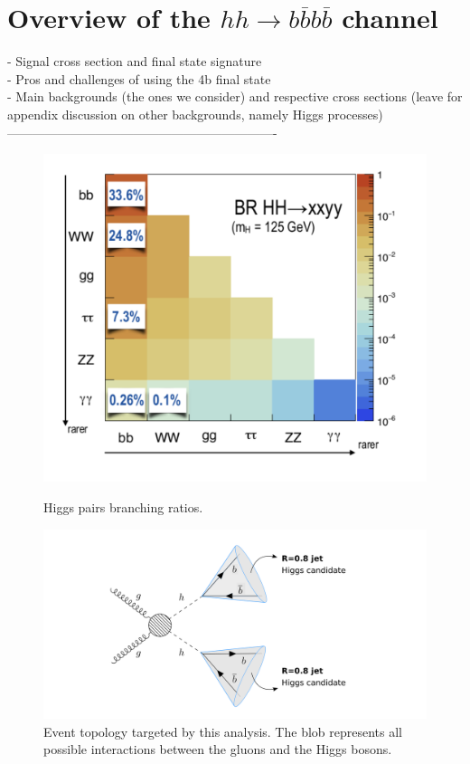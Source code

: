 \section{Overview of the $hh\rightarrow b\overline{b}b\overline{b}$ channel}
- Signal cross section and final state signature \\
- Pros and challenges of using the 4b final state \\
- Main backgrounds (the ones we consider) and respective cross sections (leave for appendix discussion on other backgrounds, namely Higgs processes)\\
----------------------------------------------------------------\\
\begin{figure}
	\centering
	\begin{minipage}{.45\textwidth}
		\centering
		\includegraphics[width=\linewidth]{./Figures/hhBR.png}
		\caption{Higgs pairs branching ratios.}
		\label{fig_hhBR}
	\end{minipage}%
	\begin{minipage}{.55\textwidth}
		\centering
		\includegraphics[trim={4cm 0 5cm 0},clip,width=\linewidth]{./Figures/boosted1.png}
		\caption{Event topology targeted by this analysis. The blob represents all possible interactions between the gluons and the Higgs bosons.}
		\label{fig:final_state}
	\end{minipage}
	\label{fig:boosted}
\end{figure}

